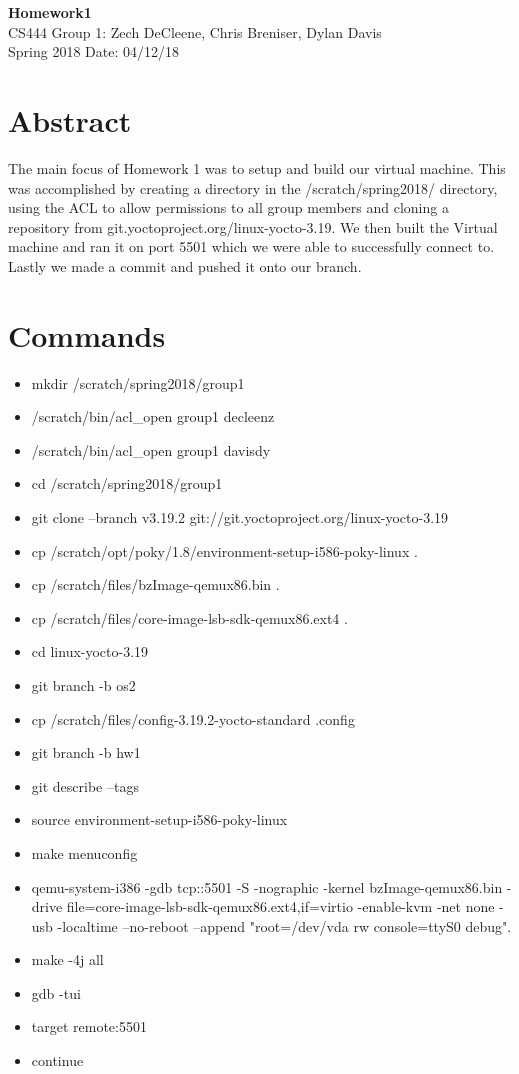\documentclass[a4paper, 10pt, draftclsnofoot, onecolumn]{article}
\begin{document}
\noindent
\large\textbf{Homework1} \hfill \\
\normalsize CS444 \hfill Group 1: Zech DeCleene, Chris Breniser, Dylan Davis \\
Spring 2018 \hfill Date: 04/12/18 \\

\section*{Abstract}
The main focus of Homework 1 was to setup and build our virtual machine. This was accomplished by creating a directory in the /scratch/spring2018/ directory, using the ACL to allow permissions to all group members and cloning a repository from git.yoctoproject.org/linux-yocto-3.19. We then built the Virtual machine and ran it on port 5501 which we were able to successfully connect to. Lastly we made a commit and pushed it onto our branch. 
\section*{Commands}

\begin{itemize}
	\item mkdir /scratch/spring2018/group1
    \item /scratch/bin/acl\_open group1 decleenz
    \item /scratch/bin/acl\_open group1 davisdy
   	\item cd /scratch/spring2018/group1
	\item git clone --branch v3.19.2 git://git.yoctoproject.org/linux-yocto-3.19
	\item cp /scratch/opt/poky/1.8/environment-setup-i586-poky-linux .
    \item cp /scratch/files/bzImage-qemux86.bin .
    \item cp /scratch/files/core-image-lsb-sdk-qemux86.ext4 .
    \item cd linux-yocto-3.19
    \item git branch -b os2 
	\item cp /scratch/files/config-3.19.2-yocto-standard .config 
    \item git branch -b hw1
    \item git describe --tags
    \item source environment-setup-i586-poky-linux
    \item make menuconfig
    \item qemu-system-i386 -gdb tcp::5501 -S -nographic -kernel bzImage-qemux86.bin -drive file=core-image-lsb-sdk-qemux86.ext4,if=virtio -enable-kvm -net none -usb -localtime --no-reboot --append "root=/dev/vda rw console=ttyS0 debug".
    \item make -4j all
    \item gdb -tui
    \item target remote:5501
    \item continue

\end{itemize}
\end{document}
